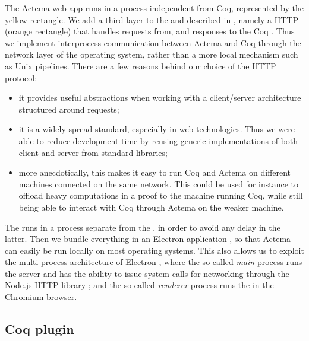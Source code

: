 The Actema web app runs in a process independent from Coq, represented by the
yellow  rectangle. We add a third layer to the
 and  described in , namely a
HTTP  (orange rectangle) that handles requests from, and
responses to the Coq . Thus we implement interprocess
communication between Actema and Coq through the network layer of the operating
system, rather than a more local mechanism such as Unix pipelines. There are a
few reasons behind our choice of the HTTP protocol:
\begin{itemize}
  \item it provides useful abstractions when working with a client/server
    architecture structured around requests;
  \item it is a widely spread standard, especially in web technologies. Thus we
    were able to reduce development time by reusing generic implementations of
    both client and server from standard libraries;
  \item more anecdotically, this makes it easy to run Coq and Actema on
    different machines connected on the same network. This could be used for
    instance to offload heavy computations in a proof to the machine running
    Coq, while still being able to interact with Coq through Actema on the
    weaker machine.
\end{itemize}
The  runs in a process separate from the , in
order to avoid any delay in the latter. Then we bundle everything in an Electron
application , so that Actema can easily be run locally on
most operating systems. This also allows us to exploit the multi-process
architecture of Electron , where the so-called
\emph{main} process runs the server and has the ability to issue system calls
for networking through the Node.js HTTP library ; and the
so-called \emph{renderer} process runs the  in the Chromium
browser.

\subsection{Coq plugin}

